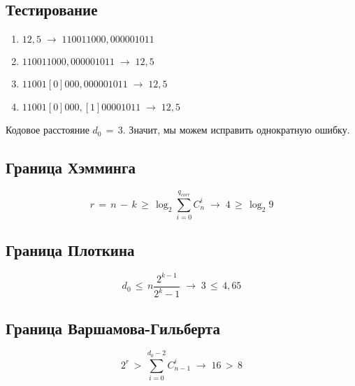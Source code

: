 \documentclass[oneside, final, 12pt]{extarticle}
\begin{document}
\subsection*{Тестирование}
\begin{enumerate}
	\item \(12,5\;\rightarrow\;110011000,000001011\)
	\item \(110011000,000001011\;\rightarrow\;12,5\)
	\item \(11001[0]000,000001011\;\rightarrow\;12,5\)
	\item \(11001[0]000,[1]00001011\;\rightarrow\;12,5\)
\end{enumerate}

Кодовое расстояние \(d_0\,=\,3\). Значит, мы можем исправить однократную ошибку.

\subsection*{Граница Хэмминга}
\[r\,=\,n\,-\,k\,\geqslant\,\log_2\sum_{i=0}^{q_{corr}} C_n^i\;\rightarrow\;4\,\geqslant\,\log_2 9\]

\subsection*{Граница Плоткина}
\[d_0\,\leqslant\,n\frac{2^{k-1}}{2^k-1}\;\rightarrow\;3\,\leqslant\,4,65\]

\subsection*{Граница Варшамова-Гильберта}
\[2^r\,>\,\sum_{i=0}^{d_0-2}C_{n-1}^i\;\rightarrow\;16\,>\,8\]
\end{document}

